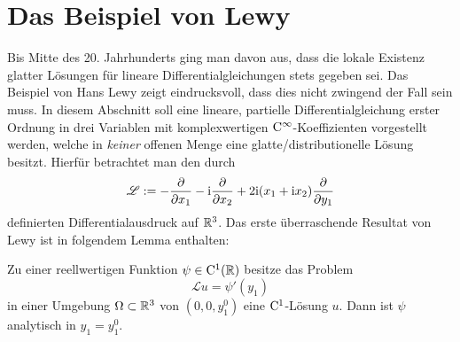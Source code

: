

\section{Das Beispiel von Lewy}


Bis Mitte des 20. Jahrhunderts ging man davon aus, dass die lokale Existenz glatter Lösungen für lineare Differentialgleichungen stets gegeben sei. Das Beispiel von Hans Lewy zeigt eindrucksvoll, dass dies nicht zwingend der Fall sein muss.  In diesem Abschnitt soll eine lineare, partielle Differentialgleichung erster Ordnung in drei Variablen mit komplexwertigen $\mathrm C^\infty$-Koeffizienten vorgestellt werden, welche in \emph{keiner} offenen Menge eine glatte/distributionelle Lösung besitzt. Hierfür betrachtet man den durch
\begin{equation}\label{lewy:differentialausdruck}
\mathscr L := -\frac{\partial}{\partial x_1} -\mathrm i\frac{\partial}{\partial x_2} +2\mathrm i(x_1+\mathrm i x_2)\frac{\partial}{\partial y_1}
\end{equation}
definierten Differentialausdruck auf $\mathbb R^3$. Das erste überraschende Resultat von Lewy ist in folgendem Lemma enthalten:
\begin{lem}\label{thm:1_lewy}
Zu einer reellwertigen Funktion $\psi\in \mathrm C^1(\mathbb{R})$ besitze das Problem
\begin{equation}\label{eq:1_lewy:gleichung}
\mathscr Lu=\psi'(y_1)
\end{equation}
in einer Umgebung $\Omega\subset\mathbb R^3$ von $(0,0,y_1^0)$ eine $\mathrm C^1$-Lösung $u$. Dann ist $\psi$ analytisch in $y_1=y_1^0$.
\end{lem}

